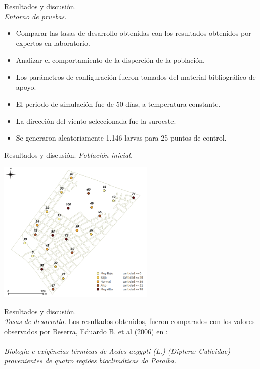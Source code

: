 \begin{frame}[t]{Resultados y discusión.\\\textit{Entorno de pruebas.}}
\begin{itemize}
	\item Comparar las tasas de desarrollo obtenidas con los resultados obtenidos por expertos en laboratorio.
	\item Analizar el comportamiento de la disperción de la población.
    \item Los parámetros de configuración fueron tomados del material bibliográfico de apoyo.
    \item El periodo de simulación fue de 50 días, a temperatura constante.
    \item La dirección del viento seleccionada fue la suroeste.
    \item Se generaron aleatoriamente 1.146 larvas para 25 puntos de control.
    \end{itemize}
\end{frame}

\begin{frame}[t]{Resultados y discusión. \textit{Población inicial.}}
    \begin{center}
        \includegraphics[width=7.5cm]{./graphics/extension-poblacion.png}
    \end{center}
\end{frame}
\begin{frame}[t]{Resultados y discusión.\\\textit{Tasas de desarrollo.}}
Los resultados obtenidos, fueron comparados con los valores observados por Beserra, Eduardo B. et al (2006) en : 
\\\text{}
\\\textit{Biologia e exigências térmicas de Aedes aegypti (L.) (Diptera: Culicidae) provenientes de quatro regiões bioclimáticas da Paraíba.}
\end{frame}

